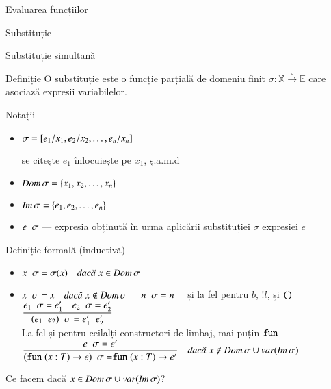 \documentclass[xcolor=pdftex,romanian,colorlinks]{beamer}
\begin{document}
\begin{section}{Evaluarea funcțiilor}
\begin{subsection}{Substituție}
\begin{frame}{Substituție simultană}
\begin{block}{Definiție}
O substituție este o funcție parțială de domeniu finit $\sigma : \mathbb{X} \stackrel{\circ}{\rightarrow} \mathbb{E}$ care asociază expresii variabilelor.
\end{block}

\begin{block}{Notații}
\begin{itemize}
\item  
$\sigma = [e_1/x_1, e_2/x_2, \ldots, e_n/x_n]$ 

se citește $e_1$ înlocuiește pe $x_1$, ș.a.m.d 
\item $\mathop{\it Dom} \sigma = \{x_1, x_2, \ldots, x_n\}$
\item $\mathop{\it Im} \sigma = \{e_1, e_2, \ldots, e_n\}$

\item $e\mathrel{}\sigma$ --- expresia obținută în urma aplicării substituției $\sigma$ expresiei $e$
\end{itemize}
\end{block}

\end{frame}

\begin{frame}{Definiție formală (inductivă)}
\begin{itemize}
\item[] $\displaystyle\reg{\substapp{x}{\sigma} = \sigma(x)}{}{x \in \Dom \sigma}$ 
\item[]
 $\displaystyle\reg{\substapp{x}{\sigma} = x}{}{x \not\in \Dom \sigma}$
\vitem[] $\displaystyle\reg{\substapp{n}{\sigma} = n}{}{}$
 \hfill și la fel pentru $b$, $!l$, și $\mathrel{\text{\ttfamily ()}}$
\vitem[] $\displaystyle\reg{\substapp{(e_1\mathrel{} e_2)}{\sigma} = e_1'\mathrel{} e_2'}{\substapp{e_1}{\sigma} = e_1' \si \substapp{e_2}{\sigma} = e_2'}{}$  
\\La fel și pentru ceilalți constructori de limbaj, mai puțin $\mathrel{\text{\ttfamily fun}}$ 
\vitem[] $\displaystyle\reg{\substapp{(\Sfun (x:T) \rightarrow e)}{\sigma} = \Sfun (x:T) \rightarrow e'}{\substapp{e}{\sigma} = e'}{x \not \in \Dom \sigma \cup \var(\Ran \sigma)}$
\end{itemize}

\vfill\alert{Ce facem dacă $x \in \mathop{\it Dom} \sigma \cup \mathop{var}(\mathop{\it Im} \sigma)$?}
\end{frame}




\end{subsection}
\end{section}
\end{document}
